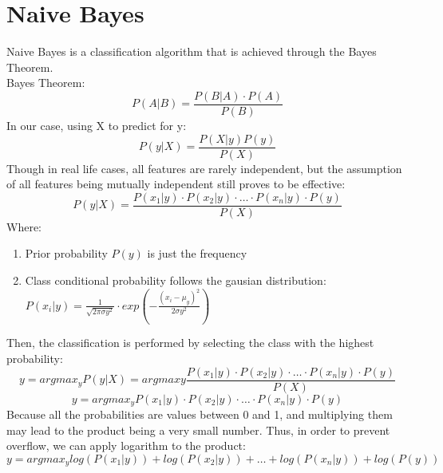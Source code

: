 \documentclass[12pt]{article}
\begin{document}
\section{Naive Bayes}
Naive Bayes is a classification algorithm that is achieved through the Bayes Theorem.\\
Bayes Theorem:
$$P(A|B) = \frac{P(B|A)\cdot P(A)}{P(B)}$$
In our case, using X to predict for y:
$$P(y|X) = \frac{P(X|y)P(y)}{P(X)}$$
Though in real life cases, all features are rarely independent, but the assumption of all features being mutually independent still proves to be effective:
$$P(y|X) = \frac{P(x_1|y)\cdot P(x_2|y)\cdot \dots \cdot P(x_n|y)\cdot P(y)}{P(X)}$$
Where:
\begin{enumerate}
	\item Prior probability $P(y)$ is just the frequency
	\item Class conditional probability follows the gausian distribution: $P(x_i|y) = \frac{1}{\sqrt{2\pi \sigma  y^2}}\cdot
exp(-\frac{(x_i - \mu_y)^2}{2\sigma  y^2})$
\end{enumerate}
Then, the classification is performed by selecting the class with the highest probability:
$$y = argmax_yP(y|X) = argmax  y\frac{P(x_1|y)\cdot P(x_2|y)\cdot \dots \cdot P(x_n|y)\cdot P(y)}{P(X)}$$
$$y = argmax_yP(x_1|y)\cdot P(x_2|y)\cdot \dots \cdot P(x_n|y)\cdot P(y)$$
Because all the probabilities are values between 0 and 1, and multiplying them may lead to the product being a very small number. Thus, in order to prevent overflow, we can apply logarithm to the product:
$$y = argmax_ylog(P(x_1|y)) + log(P(x_2|y)) + \dots + log(P(x_n|y)) + log(P(y))$$
\newpage
\end{document}
